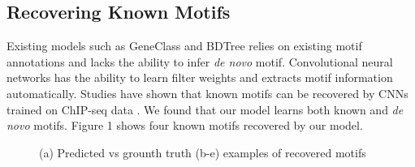 \documentclass{article}
\begin{document}
\subsection{Recovering Known Motifs}
Existing models such as GeneClass and BDTree relies on existing motif annotations and lacks the ability to infer \textit{de novo} motif. Convolutional neural networks has the ability to learn filter weights and extracts motif information automatically. Studies have shown that known motifs can be recovered by CNNs trained on ChIP-seq data \cite{Quang:2016jt,Kelley:2016bv,Alipanahi:2015fb}. We found that our model learns both known and \textit{de novo} motifs. Figure 1 shows four known motifs recovered by our model. 


\begin{figure}
\centering
{}


\caption{ (a) Predicted vs grounth truth (b-e) examples of recovered motifs}

\end{figure}



\end{document}
